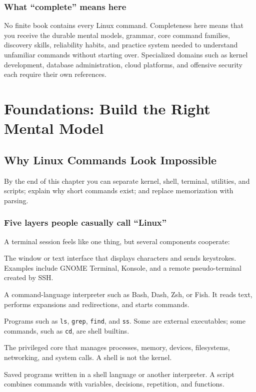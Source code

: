 \documentclass[11pt,oneside,openany]{book}
\newcommand{\chaptergoals}[1]{%
  \begin{tcolorbox}[colback=Paper,colframe=Blue,title={Learning outcomes},fonttitle=\bfseries]
  #1
  \end{tcolorbox}}
\begin{document}
\section*{What “complete” means here}
No finite book contains every Linux command. Completeness here means that you receive the durable mental models, grammar, core command families, discovery skills, reliability habits, and practice system needed to understand unfamiliar commands without starting over. Specialized domains such as kernel development, database administration, cloud platforms, and offensive security each require their own references.

\tableofcontents

\mainmatter
\part{Foundations: Build the Right Mental Model}

\chapter{Why Linux Commands Look Impossible}
\chaptergoals{By the end of this chapter you can separate kernel, shell, terminal, utilities, and scripts; explain why short commands exist; and replace memorization with parsing.}

\section{Five layers people casually call “Linux”}
A terminal session feels like one thing, but several components cooperate:
\begin{description}[style=nextline,leftmargin=2em]
  \item[Terminal emulator] The window or text interface that displays characters and sends keystrokes. Examples include GNOME Terminal, Konsole, and a remote pseudo-terminal created by SSH.
  \item[Shell] A command-language interpreter such as Bash, Dash, Zsh, or Fish. It reads text, performs expansions and redirections, and starts commands.
  \item[Utilities] Programs such as \texttt{ls}, \texttt{grep}, \texttt{find}, and \texttt{ss}. Some are external executables; some commands, such as \texttt{cd}, are shell builtins.
  \item[Kernel] The privileged core that manages processes, memory, devices, filesystems, networking, and system calls. A shell is not the kernel.
  \item[Scripts] Saved programs written in a shell language or another interpreter. A script combines commands with variables, decisions, repetition, and functions.
\end{description}
\end{document}
